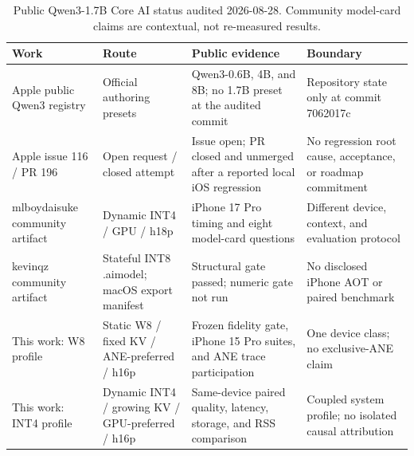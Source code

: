 \begin{table}[H]
\centering
\small
\setlength{\tabcolsep}{4pt}
\begin{tabularx}{\textwidth}{@{}>{\raggedright\arraybackslash}p{}>{\raggedright\arraybackslash}p{}>{\raggedright\arraybackslash}X >{\raggedright\arraybackslash}p{}@{}}
\toprule
Work & Route & Public evidence & Boundary \\
\midrule
Apple public Qwen3 registry & Official authoring presets & Qwen3-0.6B, 4B, and 8B; no 1.7B preset at the audited commit & Repository state only at commit 7062017c \\
Apple issue 116 / PR 196 & Open request / closed attempt & Issue open; PR closed and unmerged after a reported local iOS regression & No regression root cause, acceptance, or roadmap commitment \\
mlboydaisuke community artifact & Dynamic INT4 / GPU / h18p & iPhone 17 Pro timing and eight model-card questions & Different device, context, and evaluation protocol \\
kevinqz community artifact & Stateful INT8 .aimodel; macOS export manifest & Structural gate passed; numeric gate not run & No disclosed iPhone AOT or paired benchmark \\
This work: W8 profile & Static W8 / fixed KV / ANE-preferred / h16p & Frozen fidelity gate, iPhone 15 Pro suites, and ANE trace participation & One device class; no exclusive-ANE claim \\
This work: INT4 profile & Dynamic INT4 / growing KV / GPU-preferred / h16p & Same-device paired quality, latency, storage, and RSS comparison & Coupled system profile; no isolated causal attribution \\
\bottomrule
\end{tabularx}
\caption{Public Qwen3-1.7B Core AI status audited 2026-08-28. Community model-card claims are contextual, not re-measured results. }
\label{tab:public-status}
\end{table}
